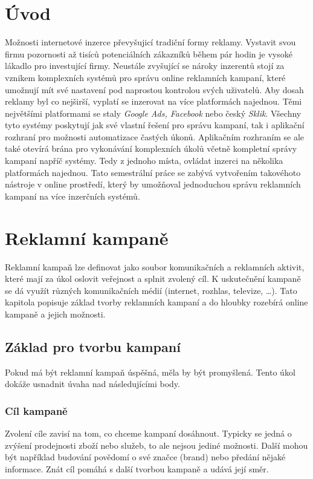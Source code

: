 \documentclass[czech,semestral]{diploma}
\begin{document}
\MakeTitlePages

\chapter{Úvod}
Možnosti internetové inzerce převyšujicí tradiční formy reklamy. Vystavit svou firmu pozornosti až tisíců potenciálních zákazníků během pár hodin je vysoké lákadlo pro investující firmy. Neustále zvyšující se nároky inzerentů stojí za vznikem komplexních systémů
pro správu online reklamních kampaní, které umožnují mít své nastavení pod naprostou kontrolou svých uživatelů. Aby dosah reklamy byl co nejširší, vyplatí se inzerovat na více platformách najednou. Těmi největšími platformami se staly
\emph{Google Ads, Facebook} nebo český \emph{Sklik}. Všechny tyto systémy poskytují jak své vlastní řešení pro správu kampaní, tak i aplikační rozhraní pro možnosti automatizace častých úkonů.
Aplikačním rozhraním se ale také otevírá brána pro vykonávání komplexních úkolů včetně kompletní správy kampaní napříč systémy. Tedy z jednoho místa, ovládat inzerci na několika platformách najednou.
Tato semestrální práce se zabývá vytvořením takovéhoto nástroje v online prostředí, který by umožňoval jednoduchou správu reklamních kampaní na více inzerčních systémů.


\chapter{Reklamní kampaně}
Reklamní kampaň lze definovat jako soubor komunikačních a reklamních aktivit, které mají za úkol oslovit veřejnost a splnit zvolený cíl. K uskutečnění kampaně se dá využít různých komunikačních
médií (internet, rozhlas, televize, \ldots). Tato kapitola popisuje základ tvorby reklamních kampaní a do hloubky rozebírá online kampaně a jejich možnosti.


\section{Základ pro tvorbu kampaní}
Pokud má být reklamní kampaň úspěšná, měla by být promyšlená. Tento úkol dokáže usnadnit úvaha nad následujícími body.

\subsection{Cíl kampaně}
Zvolení cíle zavisí na tom, co chceme kampaní dosáhnout. Typicky se jedná o zvýšení prodejnosti zboží nebo služeb, to ale nejsou jediné možnosti. Další mohou být například budování
povědomí o své značce (brand) nebo předání nějaké informace. Znát cíl pomáhá s další tvorbou kampaně a udává její směr.
\end{document}

